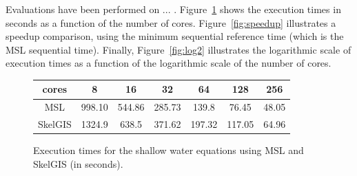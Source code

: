 
Evaluations have been performed on ... . Figure~\ref{fig:times} shows the execution times in seconds as a function of the number of cores. Figure~\ref{fig:speedup} illustrates a speedup comparison, using the minimum sequential reference time (which is the MSL sequential time). Finally, Figure~\ref{fig:log2} illustrates the logarithmic scale of execution times as a function of the logarithmic scale of the number of cores.
\begin{figure}[!h]
 \begin{center}
 \begin{tabular}{c|c|c|c|c|c|c}
   cores & 8 & 16 & 32 & 64 & 128 & 256\\
   \hline
   MSL & 998.10 & 544.86 & 285.73 & 139.8 & 76.45 & 48.05\\
   \hline
   SkelGIS & 1324.9 & 638.5 & 371.62 & 197.32 & 117.05 & 64.96\\
 \end{tabular}
\caption{Execution times for the shallow water equations using MSL and SkelGIS (in seconds).}
\label{fig:times}
 \end{center}
\end{figure}
